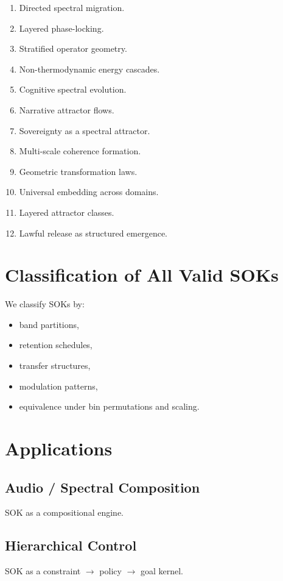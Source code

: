 \documentclass[11pt]{article}
\begin{document}
\begin{enumerate}
    \item Directed spectral migration.
    \item Layered phase-locking.
    \item Stratified operator geometry.
    \item Non-thermodynamic energy cascades.
    \item Cognitive spectral evolution.
    \item Narrative attractor flows.
    \item Sovereignty as a spectral attractor.
    \item Multi-scale coherence formation.
    \item Geometric transformation laws.
    \item Universal embedding across domains.
    \item Layered attractor classes.
    \item Lawful release as structured emergence.
\end{enumerate}

\section{Classification of All Valid SOKs}

We classify SOKs by:
\begin{itemize}
    \item band partitions,
    \item retention schedules,
    \item transfer structures,
    \item modulation patterns,
    \item equivalence under bin permutations and scaling.
\end{itemize}

\section{Applications}

\subsection{Audio / Spectral Composition}
SOK as a compositional engine.

\subsection{Hierarchical Control}
SOK as a constraint $\to$ policy $\to$ goal kernel.
\end{document}
